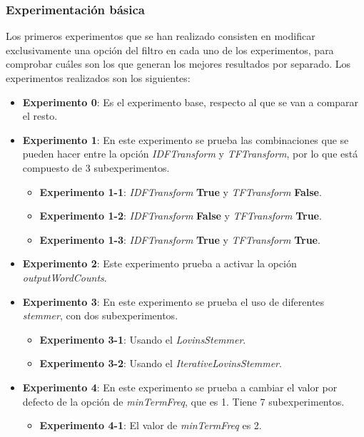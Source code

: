 \documentclass[12pt,a4paper, xcolor=table]{article}
\begin{document}
      \subsubsection{Experimentación básica}
        Los primeros experimentos que se han realizado consisten en modificar exclusivamente una opción del filtro en cada uno de los experimentos, para comprobar cuáles son los que generan los mejores resultados por separado. Los experimentos realizados son los siguientes:

        \begin{itemize}
          \item \textbf{Experimento 0}: Es el experimento base, respecto al que se van a comparar el resto.
          \item \textbf{Experimento 1}: En este experimento se prueba las combinaciones que se pueden hacer entre la opción \textit{IDFTransform} y \textit{TFTransform}, por lo que está compuesto de 3 subexperimentos.
          \begin{itemize}
            \item \textbf{Experimento 1-1}: \textit{IDFTransform} \textbf{True} y \textit{TFTransform} \textbf{False}.
            \item \textbf{Experimento 1-2}: \textit{IDFTransform} \textbf{False} y \textit{TFTransform} \textbf{True}.
            \item \textbf{Experimento 1-3}: \textit{IDFTransform} \textbf{True} y \textit{TFTransform} \textbf{True}.
          \end{itemize}
          \item \textbf{Experimento 2}: Este experimento prueba a activar la opción \textit{outputWordCounts}.
          \item \textbf{Experimento 3}: En este experimento se prueba el uso de diferentes \textit{stemmer}, con dos subexperimentos.
          \begin{itemize}
            \item \textbf{Experimento 3-1}: Usando el \textit{LovinsStemmer}.
            \item \textbf{Experimento 3-2}: Usando el \textit{IterativeLovinsStemmer}.
          \end{itemize}
          \item \textbf{Experimento 4}: En este experimento se prueba a cambiar el valor por defecto de la opción de \textit{minTermFreq}, que es 1. Tiene 7 subexperimentos.
          \begin{itemize}
            \item \textbf{Experimento 4-1}: El valor de \textit{minTermFreq} es 2.

\end{itemize}
\end{itemize}
\end{document}
